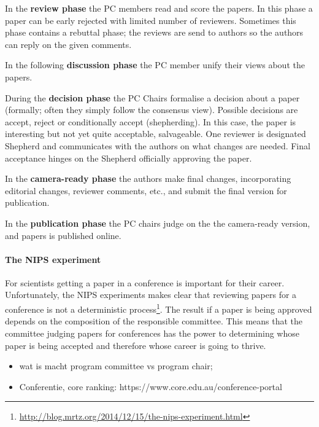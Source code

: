 \documentclass{ou-report}
\newcommand{\outline}[1]{{\color{blue} #1}}
\begin{document}
{In the \textbf{review phase} the PC members read and score the papers. In this 
phase a paper can be early rejected with limited number of reviewers. Sometimes 
this phase contains a rebuttal phase; the reviews are send to authors so the 
authors can reply on the given comments.

In the following \textbf{discussion phase} the PC member unify their views about 
the papers.

During the \textbf{decision phase} the PC Chairs formalise a decision about a 
paper (formally; often they simply follow the consensus view). Possible 
decisions are accept, reject or conditionally accept (shepherding). In this 
case, the paper is interesting but not yet quite acceptable, salvageable. One 
reviewer is designated Shepherd and communicates with the authors on what 
changes are needed. Final acceptance hinges on the Shepherd officially 
approving the paper.

In the \textbf{camera-ready phase} the authors make final changes, 
incorporating editorial changes, reviewer comments, etc., and submit the final 
version for publication.

In the \textbf{publication phase} the PC chairs judge on the the camera-ready 
version, and papers is published online.
}

\paragraph{The NIPS experiment}
For scientists getting a paper in a conference is important for their career. 
Unfortunately, the NIPS experiments makes clear that reviewing papers for a 
conference is not a deterministic
process\footnote{\url{http://blog.mrtz.org/2014/12/15/the-nips-experiment.html}}.
The result if a paper is being approved depends on the composition of the 
responsible committee. This means that the committee judging papers for 
conferences has the power to determining whose paper is being accepted and 
therefore whose career is going to thrive.


\outline{
\begin{itemize}
    \item wat is macht program committee vs program chair; 
    \item Conferentie, core ranking: https://www.core.edu.au/conference-portal
    
\end{itemize}
}
\end{document}
